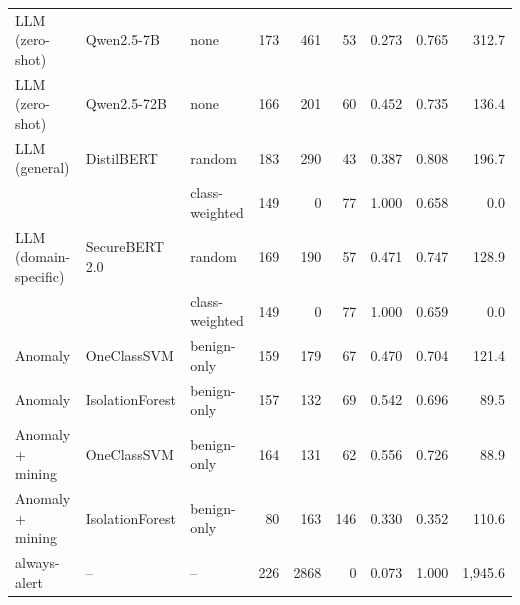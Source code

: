 \begin{table}[htbp]
{\begin{tabular}{lllrrrccr}
\addlinespace
LLM (zero-shot) & Qwen2.5-7B & none & 173 & 461 & 53 & 0.273 & 0.765 & 312.7 \\
\addlinespace
LLM (zero-shot) & Qwen2.5-72B & none & 166 & 201 & 60 & 0.452 & 0.735 & 136.4 \\
\addlinespace
LLM (general) & DistilBERT & random & 183 & 290 & 43 & 0.387 & 0.808 & 196.7 \\
 &  & class-weighted & 149 & 0 & 77 & 1.000 & 0.658 & 0.0 \\
\addlinespace
LLM (domain-specific) & SecureBERT 2.0 & random & 169 & 190 & 57 & 0.471 & 0.747 & 128.9 \\
 &  & class-weighted & 149 & 0 & 77 & 1.000 & 0.659 & 0.0 \\
\midrule
Anomaly & OneClassSVM & benign-only & 159 & 179 & 67 & 0.470 & 0.704 & 121.4 \\
\addlinespace
Anomaly & IsolationForest & benign-only & 157 & 132 & 69 & 0.542 & 0.696 & 89.5 \\
\addlinespace
Anomaly + mining & OneClassSVM & benign-only & 164 & 131 & 62 & 0.556 & 0.726 & 88.9 \\
\addlinespace
Anomaly + mining & IsolationForest & benign-only & 80 & 163 & 146 & 0.330 & 0.352 & 110.6 \\
\midrule
always-alert & -- & -- & 226 & 2868 & 0 & 0.073 & 1.000 & 1,945.6 \\
\bottomrule
\end{tabular}%
}
\end{table}
